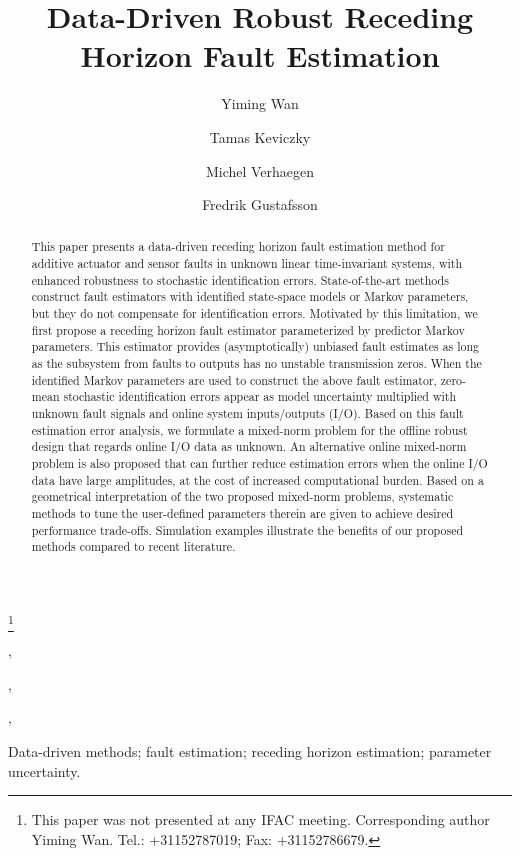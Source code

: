 \documentclass[twocolumn]{autart}
\begin{document}
\begin{frontmatter}

\title{Data-Driven Robust Receding Horizon Fault Estimation } 
\thanks[footnoteinfo]{This paper was not presented at any IFAC
meeting. Corresponding author Yiming Wan. Tel.: +31152787019;
Fax: +31152786679.}

\author[DCSC]{Yiming Wan},    \author[DCSC]{Tamas Keviczky},               \author[DCSC]{Michel Verhaegen},  \author[Linkoping]{Fredrik Gustafsson}


\address[DCSC]{Delft Center for Systems and Control, Delft University of Technology, Delft, 2628 CD, The Netherlands}  \address[Linkoping]{Department of Electrical Engineering, Link\"{o}ping University, SE-581 83 Link\"{o}ping, Sweden}             

\begin{keyword}                           Data-driven methods; fault estimation; receding horizon estimation; parameter uncertainty.               \end{keyword}                             

\begin{abstract}                          This paper presents a data-driven receding horizon fault estimation method for additive actuator and sensor faults in unknown linear time-invariant systems, with enhanced robustness to stochastic identification errors. State-of-the-art methods construct fault estimators with identified state-space models or Markov parameters, but they do not compensate for identification errors. Motivated by this limitation, we first propose a receding horizon fault estimator parameterized by predictor Markov parameters. This estimator provides (asymptotically) unbiased fault estimates as long as the subsystem from faults to outputs has no unstable transmission zeros. When the identified Markov parameters are used to construct the above fault estimator, zero-mean stochastic identification errors appear as model uncertainty multiplied with unknown fault signals and online system inputs/outputs (I/O). Based on this fault estimation error analysis, we formulate a mixed-norm problem for the offline robust design that regards online I/O data as unknown. An alternative online mixed-norm problem is also proposed that can further reduce estimation errors when the online I/O data have large amplitudes, at the cost of increased computational burden. Based on a geometrical interpretation of the two proposed mixed-norm problems, systematic methods to tune the user-defined parameters therein are given to achieve desired performance trade-offs. Simulation examples illustrate the benefits of our proposed methods compared to recent literature.
\end{abstract}

\end{frontmatter}
\end{document}
